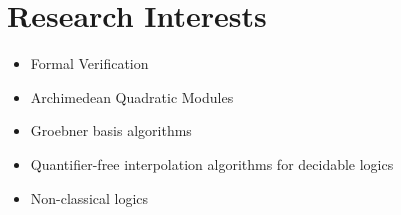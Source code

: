 \section{Research Interests}
\begin{itemize}
  \item Formal Verification
  \item Archimedean Quadratic Modules
  \item Groebner basis algorithms
  \item Quantifier-free interpolation algorithms for decidable logics
  \item Non-classical logics
\end{itemize}

